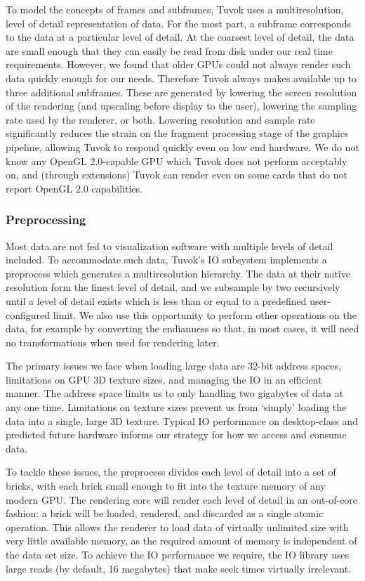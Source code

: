To model the concepts of frames and subframes, Tuvok
uses a multiresolution, level of detail representation of data.
For the most part, a subframe corresponds to the data at
a particular level of detail. At the coarsest level of detail,
the data are small enough that they can easily be read from
disk under our real time requirements. However, we found
that older GPUs could not always render such data quickly
enough for our needs. Therefore Tuvok always makes available
up to three additional subframes. These are generated
by lowering the screen resolution of the rendering (and upscaling
before display to the user), lowering the sampling
rate used by the renderer, or both. Lowering resolution and
sample rate significantly reduces the strain on the fragment
processing stage of the graphics pipeline, allowing Tuvok
to respond quickly even on low end hardware. We do not
know any OpenGL 2.0-capable GPU which Tuvok does not
perform acceptably on, and (through extensions) Tuvok can
render even on some cards that do not report OpenGL 2.0
capabilities.

\subsubsection{Preprocessing}

Most data are not fed to visualization software with
multiple levels of detail included. To accommodate such data,
Tuvok's IO subsystem implements a preprocess which generates
a multiresolution hierarchy. The data at their native
resolution form the finest level of detail, and we subsample
by two recursively until a level of detail exists which is less
than or equal to a predefined user-configured limit. We also
use this opportunity to perform other operations on the data,
for example by converting the endianness so that, in most
cases, it will need no transformations when used for rendering
later.

The primary issues we face when loading large data are
32-bit address spaces, limitations on GPU 3D texture sizes,
and managing the IO in an efficient manner. The address
space limits us to only handling two gigabytes of data at any
one time. Limitations on texture sizes prevent us from `simply'
loading the data into a single, large 3D texture. Typical
IO performance on desktop-class and predicted future hardware
informs our strategy for how we access and consume
data.

To tackle these issues, the preprocess divides each level of
detail into a set of bricks, with each brick small enough to fit
into the texture memory of any modern GPU. The rendering
core will render each level of detail in an out-of-core fashion:
a brick will be loaded, rendered, and discarded as a single
atomic operation. This allows the renderer to load data of
virtually unlimited size with very little available memory, as
the required amount of memory is independent of the data
set size. To achieve the IO performance we require, the IO
library uses large reads (by default, 16 megabytes) that make
seek times virtually irrelevant.

